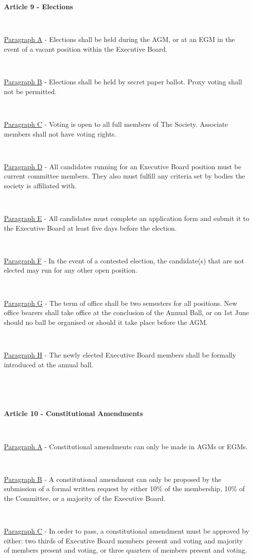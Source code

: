 ~

~

\newpage

\large{\textbf{Article 9 - Elections}}

~

\underline{Paragraph A} - Elections shall be held during the AGM, or at an EGM in
the event of a vacant position within the Executive Board.

~

\underline{Paragraph B} - Elections shall be held by secret paper ballot. 
Proxy voting shall not be permitted.

~

\underline{Paragraph C} - Voting is open to all full members of The
Society. Associate members shall not have voting rights.

~

\underline{Paragraph D} - All candidates running for an Executive Board position
must be current committee members. They also must fulfill any criteria set by bodies the society is affiliated with.

~

\underline{Paragraph E} - All candidates must complete an application
form and submit it to the Executive Board at least five days before the
election.

~

\underline{Paragraph F} - In the event of a contested election, the
candidate(s) that are not elected may run for any other open position.

~

\underline{Paragraph G} - The term of office shall be two semesters for
all positions. New office bearers shall take office at the conclusion of the Annual Ball,
or on 1st June should no ball be organised or should it take place before the AGM.


~

\underline{Paragraph H} - The newly elected Executive Board members
shall be formally introduced at the annual ball.

~

~

\newpage

\large{\textbf{Article 10 - Constitutional Amendments}}

~

\underline{Paragraph A} - Constitutional amendments can only be made in
AGMs or EGMs.

~

\underline{Paragraph B} - A constitutional amendment can only be
proposed by the submission of a formal written request by either 10\% of
the membership, 10\% of the Committee, or a majority of the Executive Board.

~

\underline{Paragraph C} - In order to pass, a constitutional amendment
must 
be approved by either: two thirds of Executive Board members present 
and voting and majority of members present and voting, or three quarters of 
members present and voting. 

~
